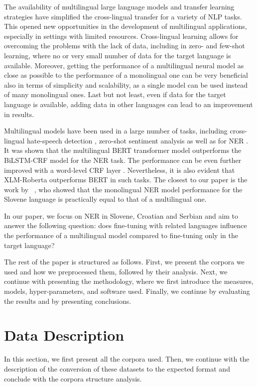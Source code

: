 \documentclass[11pt]{article}
\begin{document}
The availability of multilingual large language models and transfer learning strategies \cite{devlin-etal-2019-bert} have simplified the cross-lingual transfer for a variety of NLP tasks. 
This opened new opportunities in the development of multilingual applications, especially in settings with limited resources. 
Cross-lingual learning allows for overcoming the problems with the lack of data, including in zero- and few-shot learning, where no or very small number of data for the target language is available.
Moreover, getting the performance of a multilingual neural model as close as possible to the performance of a monolingual one can be very beneficial also in terms of simplicity and scalability, as a single model can be used instead of many monolingual ones. Last but not least, even if data for the target language is available, adding data in other languages can lead to an improvement in results.

Multilingual models have been used in a large number of tasks, including cross-lingual hate-speech detection \cite{Pelicon2021peerj}, zero-shot sentiment analysis \cite{pelicon-etal-2021-zero} as well as for NER \cite{arkhipov2019tuning,suppa2021benchmarking}.
It was shown that the multilingual BERT transformer model outperforms the BiLSTM-CRF model for the NER task. 
The performance can be even further improved with a word-level CRF layer \cite{arkhipov2019tuning}. 
Nevertheless, it is also evident that XLM-Roberta outperforms BERT \cite{suppa2021benchmarking} in such tasks. 
The closest to our paper is the work by ~\citet{prelevikj-zitnik-2021-multilingual}, who showed that the monolingual NER model performance for the Slovene language is practically equal to that of a multilingual one.

In our paper, we focus on NER in Slovene, Croatian and Serbian and aim to answer the following question: does fine-tuning with related languages influence the performance of a multilingual model compared to fine-tuning only in the target language?

The rest of the paper is structured as follows. 
First, we present the corpora we used and how we preprocessed them, followed by their analysis.
Next, we continue with presenting the methodology, where we first introduce the measures, models, hyper-parameters, and software used.
Finally, we continue by evaluating the results and by presenting conclusions.

\section{Data Description}
\label{sec:data-description}
In this section, we first present all the corpora used. Then, we continue with the description of the conversion of these datasets to the expected format and conclude with the corpora structure analysis.
\end{document}
